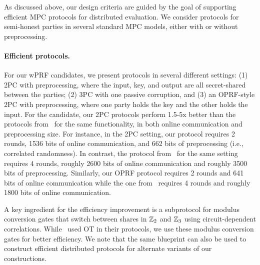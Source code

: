As discussed above, our design criteria are guided by the goal of supporting efficient MPC protocols for distributed evaluation. We consider protocols for semi-honest parties in several standard MPC models, either with or without preprocessing. 

\paragraph{Efficient protocols.} 
For our wPRF candidates, we present protocols in several different settings: (1) 2PC with preprocessing, where the input, key, and output are all secret-shared between the parties; (2) 3PC with one passive corruption, and (3) an OPRF-style 2PC with preprocessing, where one party holds the key and the other holds the input. For the \ttwPRF candidate, our 2PC protocols perform 1.5-5x better than the protocols from~\cite{boneh2018-darkmatter} for the same functionality, in both online communication and preprocessing size. For instance, in the 2PC setting, our protocol requires 2 rounds, 1536 bits of online communication, and 662 bits of preprocessing (i.e., correlated randomness). In contrast, the protocol from~\cite{boneh2018-darkmatter} for the same setting requires 4 rounds, roughly 2600 bits of online communication and roughly 3500 bits of preprocessing. Similarly, our OPRF protocol requires 2 rounds and 641 bits of online communication while the one from~\cite{boneh2018-darkmatter} requires 4 rounds and roughly 1800 bits of online communication.

A key ingredient for the efficiency improvement is a subprotocol for modulus conversion gates that switch between shares in $\mathbb{Z}_2$ and $\mathbb{Z}_3$ using circuit-dependent correlations. While~\cite{boneh2018-darkmatter} used OT in their protocols, we use these modulus conversion gates for better efficiency. We note that the same blueprint can also be used to construct efficient distributed protocols for alternate variants of our constructions.


